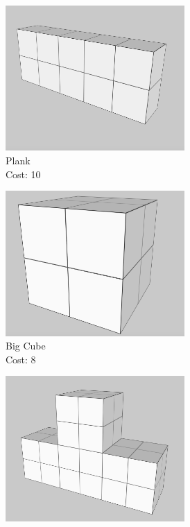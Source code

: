 \begin{figure}[htbp]
    \begin{subfigure}[b]{0.28\textwidth}
        \centering
        \includegraphics[width=0.75\textwidth]{user-study-analysis/meta/shapes/plank.png}
        \caption{Plank\\Cost: 10}
        \label{fig:plank}
    \end{subfigure}
    \hfill
    \begin{subfigure}[b]{0.28\textwidth}
        \centering
        \includegraphics[width=0.75\textwidth]{user-study-analysis/meta/shapes/big-cube.png}
        \caption{Big Cube\\Cost: 8}
        \label{fig:big-cube}
    \end{subfigure}
    \hfill
    \begin{subfigure}[b]{0.28\textwidth}
        \centering
        \includegraphics[width=0.75\textwidth]{user-study-analysis/meta/shapes/big-t-shape.png}

\end{subfigure}
\end{figure}
